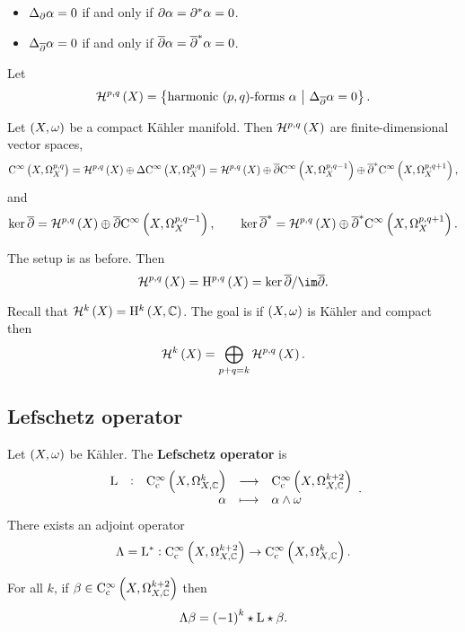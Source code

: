 \pagebreak

\begin{lemma}
\label{lem:6.20}
\hfill
\begin{itemize}
\item $ \Delta_\partial\alpha = 0 $ if and only if $ \partial\alpha = \partial^*\alpha = 0 $.
\item $ \Delta_{\overline{\partial}}\alpha = 0 $ if and only if $ \overline{\partial}\alpha = \overline{\partial}^*\alpha = 0 $.
\end{itemize}
\end{lemma}

Let
$$ \HHH^{p, q}\br{X} = \cbr{\text{harmonic $ \br{p, q} $-forms} \ \alpha \st \Delta_{\dab}\alpha = 0}. $$

\begin{theorem}
\label{thm:6.21}
Let $ \br{X, \omega} $ be a compact K\"ahler manifold. Then $ \HHH^{p, q}\br{X} $ are finite-dimensional vector spaces,
$$ \CO{X}{p, q} = \HHH^{p, q}\br{X} \oplus \Delta\CO{X}{p, q} = \HHH^{p, q}\br{X} \oplus \dab\CO{X}{p, q - 1} \oplus \dab^*\CO{X}{p, q + 1}, $$
and
$$ \ker \dab = \HHH^{p, q}\br{X} \oplus \dab\CO{X}{p, q - 1}, \qquad \ker \dab^* = \HHH^{p, q}\br{X} \oplus \dab^*\CO{X}{p, q + 1}. $$
\end{theorem}

\begin{theorem}
\label{thm:6.22}
The setup is as before. Then
$$ \HHH^{p, q}\br{X} = \H^{p, q}\br{X} = \ker \dab / \im \dab. $$
\end{theorem}

Recall that $ \HHH^k\br{X} = \H^k\br{X, \CC} $. The goal is if $ \br{X, \omega} $ is K\"ahler and compact then
$$ \HHH^k\br{X} = \bigoplus_{p + q = k} \HHH^{p, q}\br{X}. $$

\subsection{Lefschetz operator}

\begin{definition}
Let $ \br{X, \omega} $ be K\"ahler. The \textbf{Lefschetz operator} is
$$ \function[\L]{\COCc{X}{k}}{\COCc{X}{k + 2}}{\alpha}{\alpha \wedge \omega}. $$
There exists an adjoint operator
$$ \Lambda = \L^* : \COCc{X}{k + 2} \to \COCc{X}{k}. $$
\end{definition}

\begin{lemma}
For all $ k $, if $ \beta \in \COCc{X}{k + 2} $ then
$$ \Lambda\beta = \br{-1}^k\star\L\star\beta. $$
\end{lemma}

